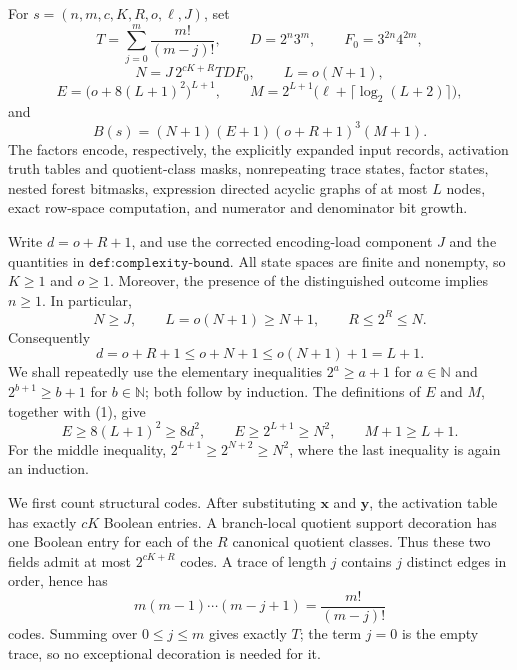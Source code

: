 For \(s=(n,m,c,K,R,o,\ell,J)\), set
\[
 T=\sum_{j=0}^{m}\frac{m!}{(m-j)!},\qquad
 D=2^n3^m,\qquad
 F_0=3^{2n}4^{2m},
\]
\[
 N=J\,2^{cK+R}TDF_0,\qquad L=o(N+1),
\]
\[
 E=\bigl(o+8(L+1)^2\bigr)^{L+1},\qquad
 M=2^{L+1}\bigl(\ell+\lceil\log_2(L+2)\rceil\bigr),
\]
and
\[
 B(s)=(N+1)(E+1)(o+R+1)^3(M+1).
\]
The factors encode, respectively, the explicitly expanded input records, activation truth tables and quotient-class masks, nonrepeating trace states, factor states, nested forest bitmasks, expression directed acyclic graphs of at most \(L\) nodes, exact row-space computation, and numerator and denominator bit growth.

Write \(d=o+R+1\), and use the corrected encoding-load component \(J\) and the quantities in \(\texttt{def:complexity-bound}\).  All state spaces are finite and nonempty, so \(K\geq 1\) and \(o\geq 1\).  Moreover, the presence of the distinguished outcome implies \(n\geq 1\).  In particular,
\[
 N\geq J,
 \qquad
 L=o(N+1)\geq N+1,
 \qquad
 R\leq 2^R\leq N.
\]
Consequently
\[
 d=o+R+1\leq o+N+1\leq o(N+1)+1=L+1. \tag{1}
\]
We shall repeatedly use the elementary inequalities \(2^a\geq a+1\) for \(a\in\mathbb N\) and \(2^{b+1}\geq b+1\) for \(b\in\mathbb N\); both follow by induction.  The definitions of \(E\) and \(M\), together with (1), give
\[
 E\geq 8(L+1)^2\geq 8d^2,
 \qquad
 E\geq 2^{L+1}\geq N^2,
 \qquad
 M+1\geq L+1. \tag{2}
\]
For the middle inequality, \(2^{L+1}\geq 2^{N+2}\geq N^2\), where the last inequality is again an induction.

We first count structural codes.  After substituting \(\mathbf x\) and \(\mathbf y\), the activation table has exactly \(cK\) Boolean entries.  A branch-local quotient support decoration has one Boolean entry for each of the \(R\) canonical quotient classes.  Thus these two fields admit at most \(2^{cK+R}\) codes.  A trace of length \(j\) contains \(j\) distinct edges in order, hence has
\[
 m(m-1)\cdots(m-j+1)=\frac{m!}{(m-j)!}
\]
codes.  Summing over \(0\leq j\leq m\) gives exactly \(T\); the term \(j=0\) is the empty trace, so no exceptional decoration is needed for it.


